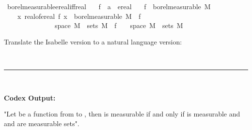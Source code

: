 \documentclass{article}
\begin{document}
\begin{boxB}
\begin{isabelle}
\isamarkupfalse \ borel{\isacharunderscore}{\kern0pt}measurable{\isacharunderscore}{\kern0pt}ereal{\isacharunderscore}{\kern0pt}iff{\isacharunderscore}{\kern0pt}real{\isacharcolon}{\kern0pt}\isanewline
\ \ \ f\ {\isacharcolon}{\kern0pt}{\isacharcolon}{\kern0pt}\ {\isachardoublequoteopen}{\isacharprime}{\kern0pt}a\ {\isasymRightarrow}\ ereal{\isachardoublequoteclose}\isanewline
\ \ \ {\isachardoublequoteopen}f\ {\isasymin}\ borel{\isacharunderscore}{\kern0pt}measurable\ M\ {\isasymlongleftrightarrow}\isanewline
\ \ \ \ {\isacharparenleft}{\kern0pt}{\isacharparenleft}{\kern0pt}{\isasymlambda}x{\isachardot}{\kern0pt}\ real{\isacharunderscore}{\kern0pt}of{\isacharunderscore}{\kern0pt}ereal\ {\isacharparenleft}{\kern0pt}f\ x{\isacharparenright}{\kern0pt}{\isacharparenright}{\kern0pt}\ {\isasymin}\ borel{\isacharunderscore}{\kern0pt}measurable\ M\ {\isasymand}\ f\ {\isacharminus}{\kern0pt}{\isacharbackquote}{\kern0pt}\ {\isacharbraceleft}{\kern0pt}{\isasyminfinity}{\isacharbraceright}{\kern0pt}\ \isanewline
\ \ \ \ \ \ \ \ \ \ \ \ \ \ {\isasyminter}\ space\ M\ {\isasymin}\ sets\ M\ {\isasymand}\ f\ {\isacharminus}{\kern0pt}{\isacharbackquote}{\kern0pt}\ {\isacharbraceleft}{\kern0pt}{\isacharminus}{\kern0pt}{\isasyminfinity}{\isacharbraceright}{\kern0pt}\ {\isasyminter}\ space\ M\ {\isasymin}\ sets\ M{\isacharparenright}{\kern0pt}{\isachardoublequoteclose}
\end{isabelle}
Translate the Isabelle version to a natural language version:

\
\hrule
\

\textbf{Codex Output:}

"Let  be a function from  to , then  is measurable if and only if  is measurable and  and  are measurable sets".
\end{boxB}
\end{document}

